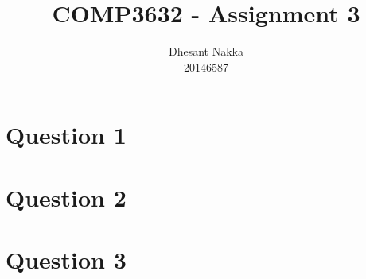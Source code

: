 \documentclass[12pt,a4paper]{article}
\title{COMP3632 - Assignment 3}
\author{Dhesant Nakka\\20146587}
\begin{document}
\maketitle

\section{Question 1}

\section{Question 2}

\section{Question 3}
\end{document}

